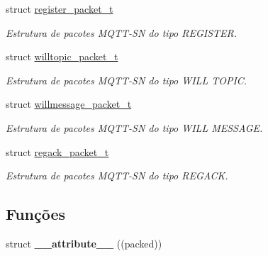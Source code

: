 \begin{DoxyCompactItemize}
struct \hyperlink{structregister__packet__t}{register\+\_\+packet\+\_\+t}
\begin{DoxyCompactList}\small\item\em Estrutura de pacotes M\+Q\+T\+T-\/\+S\+N do tipo R\+E\+G\+I\+S\+T\+E\+R. \end{DoxyCompactList}\item 
struct \hyperlink{structwilltopic__packet__t}{willtopic\+\_\+packet\+\_\+t}
\begin{DoxyCompactList}\small\item\em Estrutura de pacotes M\+Q\+T\+T-\/\+S\+N do tipo W\+I\+L\+L T\+O\+P\+I\+C. \end{DoxyCompactList}\item 
struct \hyperlink{structwillmessage__packet__t}{willmessage\+\_\+packet\+\_\+t}
\begin{DoxyCompactList}\small\item\em Estrutura de pacotes M\+Q\+T\+T-\/\+S\+N do tipo W\+I\+L\+L M\+E\+S\+S\+A\+G\+E. \end{DoxyCompactList}\item 
struct \hyperlink{structregack__packet__t}{regack\+\_\+packet\+\_\+t}
\begin{DoxyCompactList}\small\item\em Estrutura de pacotes M\+Q\+T\+T-\/\+S\+N do tipo R\+E\+G\+A\+C\+K. \end{DoxyCompactList}\end{DoxyCompactItemize}
\subsection*{Funções}
\begin{DoxyCompactItemize}
\item 
\hypertarget{group__Pacotes_gab898071398b359603a35c202e9c65f3b}{struct {\bfseries \+\_\+\+\_\+attribute\+\_\+\+\_\+} ((packed))}\label{group__Pacotes_gab898071398b359603a35c202e9c65f3b}

\end{DoxyCompactItemize}
